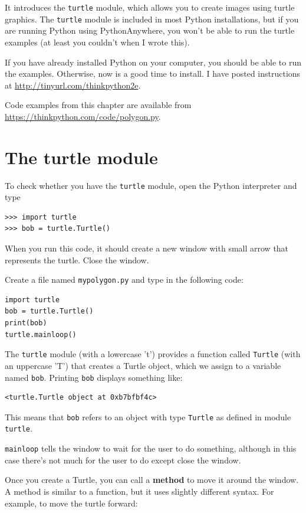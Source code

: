 \documentclass[10pt]{book}
\begin{document}
It introduces the {\tt turtle} module, which allows you to
create images using turtle graphics.  The {\tt turtle} module is
included in most Python installations, but if you are running Python
using PythonAnywhere, you won't be able to run the turtle examples (at
least you couldn't when I wrote this).

If you have already installed Python on your computer, you should
be able to run the examples.  Otherwise, now is a good time
to install.  I have posted instructions at
\url{http://tinyurl.com/thinkpython2e}.

Code examples from this chapter are available from
\url{https://thinkpython.com/code/polygon.py}.


\section{The turtle module}
\label{turtle}

To check whether you have the {\tt turtle} module, open the Python
interpreter and type

\begin{verbatim}
>>> import turtle
>>> bob = turtle.Turtle()
\end{verbatim}

When you run this code, it should create a new window
with small arrow that represents the turtle.  Close the window.

Create a file named {\tt mypolygon.py} and type in the following
code:

\begin{verbatim}
import turtle
bob = turtle.Turtle()
print(bob)
turtle.mainloop()
\end{verbatim}
%
The {\tt turtle} module (with a lowercase 't') provides a function
called {\tt Turtle} (with an uppercase 'T') that creates a Turtle
object, which we assign to a variable named {\tt bob}.
Printing {\tt bob} displays something like:

\begin{verbatim}
<turtle.Turtle object at 0xb7bfbf4c>
\end{verbatim}
%
This means that {\tt bob} refers to an object with type
{\tt Turtle}
as defined in module {\tt turtle}.

\verb"mainloop" tells the window to wait for the user
to do something, although in this case there's not much for
the user to do except close the window.

Once you create a Turtle, you can call a {\bf method} to move it
around the window.  A method is similar to a function, but it
uses slightly different syntax.  For example, to move the turtle
forward:
\end{document}

